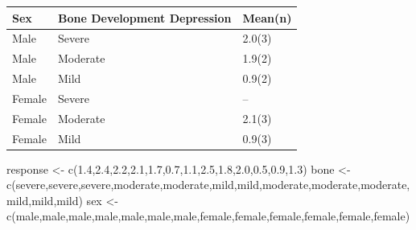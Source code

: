 \documentclass[
]{book}
\newenvironment{Shaded}{\begin{snugshade}}{\end{snugshade}}
\newcommand{\FloatTok}[1]{\textcolor[rgb]{0.00,0.00,0.81}{#1}}
\newcommand{\FunctionTok}[1]{\textcolor[rgb]{0.00,0.00,0.00}{#1}}
\newcommand{\NormalTok}[1]{#1}
\newcommand{\OtherTok}[1]{\textcolor[rgb]{0.56,0.35,0.01}{#1}}
\newcommand{\StringTok}[1]{\textcolor[rgb]{0.31,0.60,0.02}{#1}}
\begin{document}
\begin{longtable}[]{@{}lll@{}}
\toprule()
Sex & Bone Development Depression & Mean(n) \\
\midrule()
\endhead
Male & Severe & 2.0(3) \\
Male & Moderate & 1.9(2) \\
Male & Mild & 0.9(2) \\
Female & Severe & -- \\
Female & Moderate & 2.1(3) \\
Female & Mild & 0.9(3) \\
\bottomrule()
\end{longtable}

\begin{Shaded}
\begin{Highlighting}[]
\NormalTok{response }\OtherTok{\textless{}{-}} \FunctionTok{c}\NormalTok{(}\FloatTok{1.4}\NormalTok{,}\FloatTok{2.4}\NormalTok{,}\FloatTok{2.2}\NormalTok{,}\FloatTok{2.1}\NormalTok{,}\FloatTok{1.7}\NormalTok{,}\FloatTok{0.7}\NormalTok{,}\FloatTok{1.1}\NormalTok{,}\FloatTok{2.5}\NormalTok{,}\FloatTok{1.8}\NormalTok{,}\FloatTok{2.0}\NormalTok{,}\FloatTok{0.5}\NormalTok{,}\FloatTok{0.9}\NormalTok{,}\FloatTok{1.3}\NormalTok{)}
\NormalTok{bone }\OtherTok{\textless{}{-}} \FunctionTok{c}\NormalTok{(}\StringTok{\textquotesingle{}severe\textquotesingle{}}\NormalTok{,}\StringTok{\textquotesingle{}severe\textquotesingle{}}\NormalTok{,}\StringTok{\textquotesingle{}severe\textquotesingle{}}\NormalTok{,}\StringTok{\textquotesingle{}moderate\textquotesingle{}}\NormalTok{,}\StringTok{\textquotesingle{}moderate\textquotesingle{}}\NormalTok{,}\StringTok{\textquotesingle{}mild\textquotesingle{}}\NormalTok{,}\StringTok{\textquotesingle{}mild\textquotesingle{}}\NormalTok{,}\StringTok{\textquotesingle{}moderate\textquotesingle{}}\NormalTok{,}\StringTok{\textquotesingle{}moderate\textquotesingle{}}\NormalTok{,}\StringTok{\textquotesingle{}moderate\textquotesingle{}}\NormalTok{,}\StringTok{\textquotesingle{}mild\textquotesingle{}}\NormalTok{,}\StringTok{\textquotesingle{}mild\textquotesingle{}}\NormalTok{,}\StringTok{\textquotesingle{}mild\textquotesingle{}}\NormalTok{)}
\NormalTok{sex }\OtherTok{\textless{}{-}} \FunctionTok{c}\NormalTok{(}\StringTok{\textquotesingle{}male\textquotesingle{}}\NormalTok{,}\StringTok{\textquotesingle{}male\textquotesingle{}}\NormalTok{,}\StringTok{\textquotesingle{}male\textquotesingle{}}\NormalTok{,}\StringTok{\textquotesingle{}male\textquotesingle{}}\NormalTok{,}\StringTok{\textquotesingle{}male\textquotesingle{}}\NormalTok{,}\StringTok{\textquotesingle{}male\textquotesingle{}}\NormalTok{,}\StringTok{\textquotesingle{}male\textquotesingle{}}\NormalTok{,}\StringTok{\textquotesingle{}female\textquotesingle{}}\NormalTok{,}\StringTok{\textquotesingle{}female\textquotesingle{}}\NormalTok{,}\StringTok{\textquotesingle{}female\textquotesingle{}}\NormalTok{,}\StringTok{\textquotesingle{}female\textquotesingle{}}\NormalTok{,}\StringTok{\textquotesingle{}female\textquotesingle{}}\NormalTok{,}\StringTok{\textquotesingle{}female\textquotesingle{}}\NormalTok{)}

\end{Highlighting}
\end{Shaded}
\end{document}
